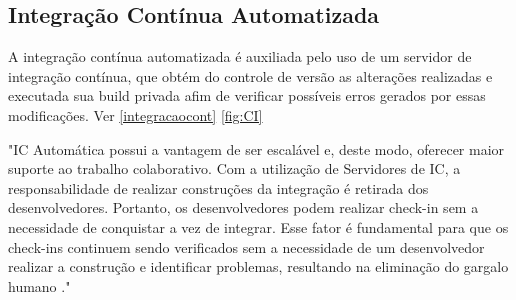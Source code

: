 \subsection{Integração Contínua Automatizada}
A integração contínua automatizada é auxiliada pelo uso de um servidor de integração contínua, que obtém do controle de versão as alterações realizadas e executada sua build privada afim de verificar possíveis erros gerados por essas modificações. Ver \autoref{integracaocont} \autoref{fig:CI} 
\begin{citacao}
 "IC Automática possui a vantagem de ser escalável 
e,  deste  modo,  oferecer  maior  suporte  ao  trabalho  colaborativo.  Com  a  utilização  de 
Servidores  de  IC,  a  responsabilidade  de  realizar  construções  da  integração  é  retirada  dos desenvolvedores. Portanto, os desenvolvedores podem realizar  check-in  sem a necessidade de 
conquistar a vez de integrar. Esse fator é fundamental para que os  check-ins  continuem sendo 
verificados  sem  a  necessidade  de  um desenvolvedor  realizar  a  construção  e identificar 
problemas, resultando na eliminação do gargalo humano ." 
\end{citacao}


